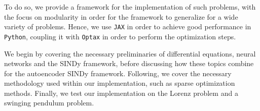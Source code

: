 To do so, we provide a framework for the implementation of such problems, with the focus on modularity in order for the framework to generalize for a wide variety of problems. Hence, we use \verb|JAX| \cite{jax2018github} in order to achieve good performance in \verb|Python|, coupling it with \verb|Optax| \cite{deepmind2020jax} in order to perform the optimization steps. 

We begin by covering the necessary preliminaries of differential equations, neural networks and the SINDy framework, before discussing how these topics combine for the autoencoder SINDy framework. Following, we cover the necessary methodology used within our implementation, such as sparse optimization methods. Finally, we test our implementation on the Lorenz problem and a swinging pendulum problem.%